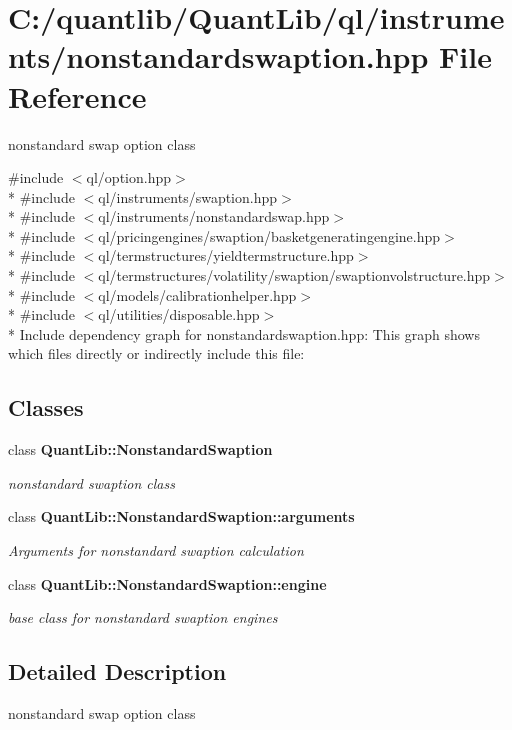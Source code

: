 \section{C\+:/quantlib/\+Quant\+Lib/ql/instruments/nonstandardswaption.hpp File Reference}
\label{nonstandardswaption_8hpp}


nonstandard swap option class  


{\ttfamily \#include $<$ql/option.\+hpp$>$}\\*
{\ttfamily \#include $<$ql/instruments/swaption.\+hpp$>$}\\*
{\ttfamily \#include $<$ql/instruments/nonstandardswap.\+hpp$>$}\\*
{\ttfamily \#include $<$ql/pricingengines/swaption/basketgeneratingengine.\+hpp$>$}\\*
{\ttfamily \#include $<$ql/termstructures/yieldtermstructure.\+hpp$>$}\\*
{\ttfamily \#include $<$ql/termstructures/volatility/swaption/swaptionvolstructure.\+hpp$>$}\\*
{\ttfamily \#include $<$ql/models/calibrationhelper.\+hpp$>$}\\*
{\ttfamily \#include $<$ql/utilities/disposable.\+hpp$>$}\\*
Include dependency graph for nonstandardswaption.\+hpp\+:
This graph shows which files directly or indirectly include this file\+:
\subsection*{Classes}
\begin{DoxyCompactItemize}
\item 
class {\bf Quant\+Lib\+::\+Nonstandard\+Swaption}
\begin{DoxyCompactList}\small\item\em nonstandard swaption class \end{DoxyCompactList}\item 
class {\bf Quant\+Lib\+::\+Nonstandard\+Swaption\+::arguments}
\begin{DoxyCompactList}\small\item\em Arguments for nonstandard swaption calculation \end{DoxyCompactList}\item 
class {\bf Quant\+Lib\+::\+Nonstandard\+Swaption\+::engine}
\begin{DoxyCompactList}\small\item\em base class for nonstandard swaption engines \end{DoxyCompactList}\end{DoxyCompactItemize}


\subsection{Detailed Description}
nonstandard swap option class 

